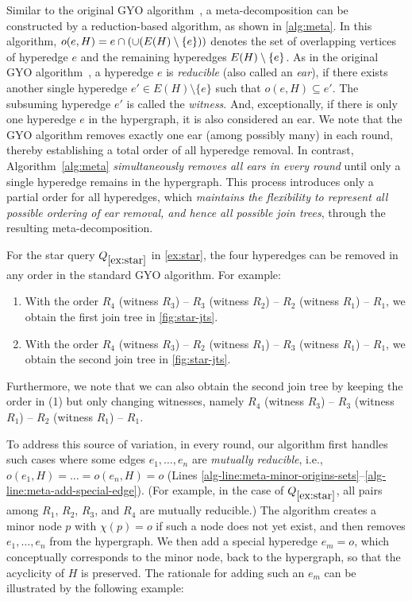 Similar to the original GYO algorithm~\cite{grahamGYO,DBLP:conf/compsac/YuO79}, a meta-decomposition can be constructed by a reduction-based algorithm, as shown in \cref{alg:meta}. In this algorithm, $o(e, H) = e \cap ( \cup (E(H) \setminus \lbrace e\rbrace) )$ denotes the set of overlapping vertices of hyperedge $e$ and the remaining hyperedges $E(H) \setminus \lbrace e\rbrace$.  As in the original GYO algorithm~\cite{grahamGYO,DBLP:conf/compsac/YuO79}, a hyperedge $e$ is \emph{reducible} (also called an \emph{ear}), if there exists another single hyperedge $e' \in E(H) \setminus \{ e \}$ such that $o(e, H) \subseteq e'$.  
The subsuming hyperedge $e'$ is called the \emph{witness}.
And, exceptionally, if there is only one hyperedge $e$ in the hypergraph, it is also considered an ear.
We note that the GYO algorithm removes exactly one ear (among possibly many) in each round, thereby establishing a total order of all hyperedge removal.
In contrast, Algorithm~\ref{alg:meta} \emph{simultaneously removes all ears in every round} until only a single hyperedge remains in the hypergraph. This process introduces only a partial order for all hyperedges, which \emph{maintains the flexibility to represent all possible ordering of ear removal, and hence all possible join trees}, through the resulting meta-decomposition.

\begin{example}
    For the star query $Q_{\ref{ex:star}}$ in \cref{ex:star}, the four hyperedges can be removed in any order in the standard GYO algorithm. For example:
    \begin{enumerate}[leftmargin=*]
        \item With the order $R_4$ (witness $R_3$) -- $R_3$ (witness $R_2$) -- $R_2$ (witness $R_1$) -- $R_1$, we obtain the first join tree in \cref{fig:star-jts}.
        \item With the order $R_4$ (witness $R_3$) -- $R_2$ (witness $R_1$) -- $R_3$ (witness $R_1$) -- $R_1$, we obtain the second join tree in \cref{fig:star-jts}.
    \end{enumerate}
    Furthermore, we note that we can also obtain the second join tree by keeping the order in (1) but only changing witnesses, namely $R_4$ (witness $R_3$) -- $R_3$ (witness $R_1$) -- $R_2$ (witness $R_1$) -- $R_1$.
\end{example}


To address this source of variation, in every round, our algorithm first handles such cases where some edges $ e_1, \dots, e_n$ are \emph{mutually reducible}, i.e., $o(e_1, H) = \dots = o(e_n, H) = o$ (Lines \ref{alg-line:meta-minor-origins-sets}--\ref{alg-line:meta-add-special-edge}).  
(For example, in the case of $Q_{\ref{ex:star}}$, all pairs among $R_1$, $R_2$, $R_3$, and $R_4$ are mutually reducible.)
The algorithm creates a minor node $p$ with $\chi(p) = o$ if such a node does not yet exist, and then removes $e_1, \dots, e_n$ from the hypergraph.  We then add a special hyperedge $e_m = o$, which conceptually corresponds to the minor node, back to the hypergraph, so that the acyclicity of $H$ is preserved. The rationale for adding such an $e_m$ can be illustrated by the following example:

